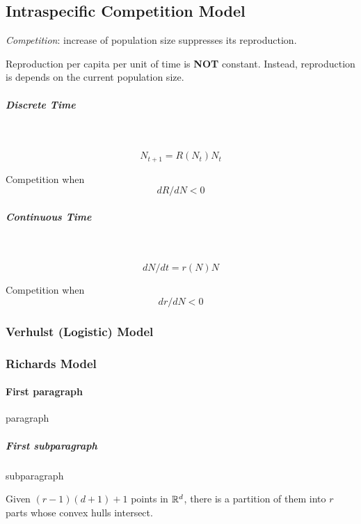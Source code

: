 \newpage
\subsection{Intraspecific Competition Model}

\emph{Competition}: increase of population size suppresses its reproduction.

\begin{assumption}
    Reproduction per capita per unit of time is \textbf{NOT} constant. Instead, reproduction is depends on the current population size.
\end{assumption}

\subparagraph{Discrete Time}~{
    $$
    N_{t+1} = R(N_t)N_t
    $$
    \par{Competition when}
    $$
    dR/dN <0
    $$
}
\subparagraph{Continuous Time}~{
    $$
    dN/dt = r(N)N
    $$
    \par{Competition when}
    $$
    dr/dN <0
    $$
}

\subsubsection{Verhulst (Logistic) Model}

\newpage
\subsubsection{Richards Model}

\newpage


\paragraph{First paragraph}
paragraph

\subparagraph{First subparagraph}
subparagraph

\begin{theorem}
    Given $(r-1)(d+1)+1$ points in $\mathbb{R}^d$, there is a partition of them into $r$ parts whose convex hulls intersect.
\end{theorem}